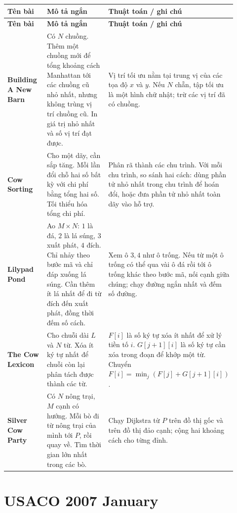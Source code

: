 \documentclass[11pt]{article}
\newenvironment{solutiontable}{%
  \small
  \setlength{\tabcolsep}{4pt}
  \renewcommand{\arraystretch}{1.14}
  \begin{longtable}{L{0.19\linewidth}L{0.39\linewidth}L{0.34\linewidth}}
  \toprule
  \textbf{Tên bài} & \textbf{Mô tả ngắn} & \textbf{Thuật toán / ghi chú}\\
  \midrule
  \endfirsthead
  \toprule
  \textbf{Tên bài} & \textbf{Mô tả ngắn} & \textbf{Thuật toán / ghi chú}\\
  \midrule
  \endhead
}{%
  \bottomrule
  \end{longtable}
  \normalsize
}
\newcommand{\problemrow}[3]{\textbf{#1} & #2 & #3\\\midrule}
\begin{document}
\begin{solutiontable}
\problemrow{Building A New Barn}{Có \(N\) chuồng. Thêm một chuồng mới để tổng khoảng cách Manhattan tới các chuồng cũ nhỏ nhất, nhưng không trùng vị trí chuồng cũ. In giá trị nhỏ nhất và số vị trí đạt được.}{Vị trí tối ưu nằm tại trung vị của các tọa độ \(x\) và \(y\). Nếu \(N\) chẵn, tập tối ưu là một hình chữ nhật; trừ các vị trí đã có chuồng.}
\problemrow{Cow Sorting}{Cho một dãy, cần sắp tăng. Mỗi lần đổi chỗ hai số bất kỳ với chi phí bằng tổng hai số. Tối thiểu hóa tổng chi phí.}{Phân rã thành các chu trình. Với mỗi chu trình, so sánh hai cách: dùng phần tử nhỏ nhất trong chu trình để hoán đổi, hoặc đưa phần tử nhỏ nhất toàn dãy vào hỗ trợ.}
\problemrow{Lilypad Pond}{Ao \(M\times N\): \(1\) là đá, \(2\) là lá súng, \(3\) xuất phát, \(4\) đích. Chỉ nhảy theo bước mã và chỉ đáp xuống lá súng. Cần thêm ít lá nhất để đi từ đích đến xuất phát, đồng thời đếm số cách.}{Xem ô \(3,4\) như ô trống. Nếu từ một ô trống có thể qua vài ô đá rồi tới ô trống khác theo bước mã, nối cạnh giữa chúng; chạy đường ngắn nhất và đếm số đường.}
\problemrow{The Cow Lexicon}{Cho chuỗi dài \(L\) và \(N\) từ. Xóa ít ký tự nhất để chuỗi còn lại phân tách được thành các từ.}{\(F[i]\) là số ký tự xóa ít nhất để xử lý tiền tố \(i\). \(G[j+1][i]\) là số ký tự cần xóa trong đoạn để khớp một từ. Chuyển \(F[i]=\min_j(F[j]+G[j+1][i])\).}
\problemrow{Silver Cow Party}{Có \(N\) nông trại, \(M\) cạnh có hướng. Mỗi bò đi từ nông trại của mình tới \(P\), rồi quay về. Tìm thời gian lớn nhất trong các bò.}{Chạy Dijkstra từ \(P\) trên đồ thị gốc và trên đồ thị đảo cạnh; cộng hai khoảng cách cho từng đỉnh.}
\end{solutiontable}

\section{USACO 2007 January}
\end{document}
